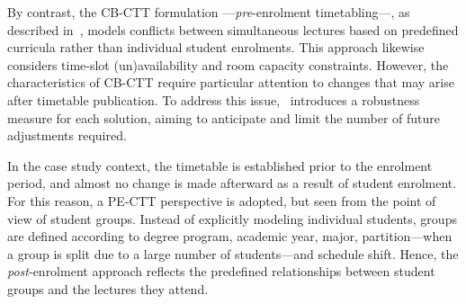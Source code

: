     By contrast, the CB-CTT formulation ---\textit{pre}-enrolment timetabling---, as described in~\cite{akkan2022bi}, models conflicts between simultaneous lectures based on predefined curricula rather than individual student enrolments. This approach likewise considers time-slot (un)availability and room capacity constraints. However, the characteristics of CB-CTT require particular attention to changes that may arise after timetable publication. To address this issue,~\cite{akkan2022bi} introduces a robustness measure for each solution, aiming to anticipate and limit the number of future adjustments required.
    
    In the case study context, the timetable is established prior to the enrolment period, and almost no change is made afterward as a result of student enrolment. For this reason, a PE‑CTT perspective is adopted, but seen from the point of view of student groups. Instead of explicitly modeling individual students, groups are defined according to degree program, academic year, major, partition—when a group is split due to a large number of students—and schedule shift. Hence, the \textit{post}‑enrolment approach reflects the predefined relationships between student groups and the lectures they attend.
    
    
